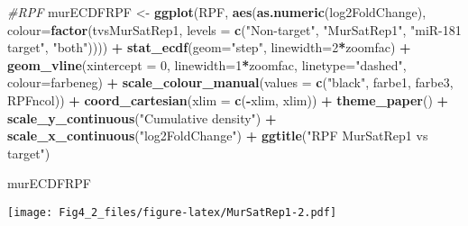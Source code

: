 \documentclass[
]{article}
\newenvironment{Shaded}{\begin{snugshade}}{\end{snugshade}}
\newcommand{\AttributeTok}[1]{\textcolor[rgb]{0.13,0.29,0.53}{#1}}
\newcommand{\CommentTok}[1]{\textcolor[rgb]{0.56,0.35,0.01}{\textit{#1}}}
\newcommand{\DecValTok}[1]{\textcolor[rgb]{0.00,0.00,0.81}{#1}}
\newcommand{\FunctionTok}[1]{\textcolor[rgb]{0.13,0.29,0.53}{\textbf{#1}}}
\newcommand{\NormalTok}[1]{#1}
\newcommand{\OtherTok}[1]{\textcolor[rgb]{0.56,0.35,0.01}{#1}}
\newcommand{\SpecialCharTok}[1]{\textcolor[rgb]{0.81,0.36,0.00}{\textbf{#1}}}
\newcommand{\StringTok}[1]{\textcolor[rgb]{0.31,0.60,0.02}{#1}}
\begin{document}
\begin{Shaded}
\begin{Highlighting}[]
\CommentTok{\#RPF}
\NormalTok{murECDFRPF }\OtherTok{\textless{}{-}} \FunctionTok{ggplot}\NormalTok{(RPF, }\FunctionTok{aes}\NormalTok{(}\FunctionTok{as.numeric}\NormalTok{(log2FoldChange), }\AttributeTok{colour=}\FunctionTok{factor}\NormalTok{(tvsMurSatRep1, }\AttributeTok{levels =} \FunctionTok{c}\NormalTok{(}\StringTok{"Non{-}target"}\NormalTok{, }\StringTok{"MurSatRep1"}\NormalTok{, }\StringTok{"miR{-}181 target"}\NormalTok{, }\StringTok{"both"}\NormalTok{)))) }\SpecialCharTok{+} 
  \FunctionTok{stat\_ecdf}\NormalTok{(}\AttributeTok{geom=}\StringTok{"step"}\NormalTok{, }\AttributeTok{linewidth=}\DecValTok{2}\SpecialCharTok{*}\NormalTok{zoomfac) }\SpecialCharTok{+}
  \FunctionTok{geom\_vline}\NormalTok{(}\AttributeTok{xintercept =} \DecValTok{0}\NormalTok{, }\AttributeTok{linewidth=}\DecValTok{1}\SpecialCharTok{*}\NormalTok{zoomfac, }\AttributeTok{linetype=}\StringTok{"dashed"}\NormalTok{, }\AttributeTok{colour=}\NormalTok{farbeneg) }\SpecialCharTok{+}
  \FunctionTok{scale\_colour\_manual}\NormalTok{(}\AttributeTok{values =} \FunctionTok{c}\NormalTok{(}\StringTok{"black"}\NormalTok{, farbe1, farbe3, RPFncol)) }\SpecialCharTok{+}
  \FunctionTok{coord\_cartesian}\NormalTok{(}\AttributeTok{xlim =} \FunctionTok{c}\NormalTok{(}\SpecialCharTok{{-}}\NormalTok{xlim, xlim)) }\SpecialCharTok{+} 
  \FunctionTok{theme\_paper}\NormalTok{() }\SpecialCharTok{+}
  \FunctionTok{scale\_y\_continuous}\NormalTok{(}\StringTok{"Cumulative density"}\NormalTok{) }\SpecialCharTok{+} \FunctionTok{scale\_x\_continuous}\NormalTok{(}\StringTok{"log2FoldChange"}\NormalTok{) }\SpecialCharTok{+}
  \FunctionTok{ggtitle}\NormalTok{(}\StringTok{"RPF MurSatRep1 vs target"}\NormalTok{)}

\NormalTok{murECDFRPF}
\end{Highlighting}
\end{Shaded}

\texttt{[image: Fig4\_2\_files/figure-latex/MurSatRep1-2.pdf]}
\end{document}
